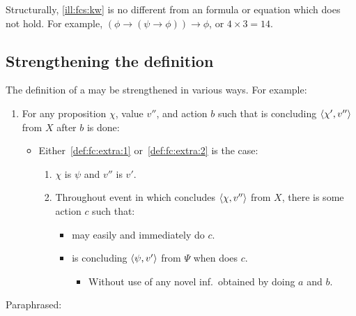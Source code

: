 \begin{note}
  Structurally, \autoref{ill:fcs:kw} is no different from an formula or equation which does not hold.
  For example, \((\phi \rightarrow (\psi \rightarrow \phi)) \rightarrow \phi\), or \(4 \times 3 = 14\).
\end{note}

\subsection{Strengthening the definition}

\begin{note}
  The definition of a \fc{} may be strengthened in various ways.
  For example:

  \begin{enumerate}[label=\alph*., ref=(\alph*), resume*=fcCounter]
  \item
    \label{def:fc:alt:c}
    For any proposition \(\chi\), value \(v''\), and action \(b\) such that \vAgent{} is concluding \(\langle \chi', v'' \rangle\) from \(X\) after \(b\) is done:
    \begin{itemize}
    \item
      Either~\ref{def:fc:extra:1} or~\ref{def:fc:extra:2} is the case:
      \begin{enumerate}[label=\arabic*., ref=\arabic*]
      \item
        \label{def:fc:extra:1}
        \(\chi\) is \(\psi\) and \(v''\) is \(v'\).
      \item
        \label{def:fc:extra:2}
        Throughout event in which \vAgent{} concludes \(\langle \chi, v'' \rangle\) from \(X\), there is some action \(c\) such that:
        \begin{itemize}
        \item
          \vAgent{} may easily and immediately do \(c\).
        \item
          \vAgent{} is concluding \(\langle \psi, v' \rangle\) from \(\Psi\) when \vAgent{} does \(c\).
          \begin{itemize}
          \item
            Without use of any novel inf.\ obtained by doing \(a\) and \(b\).
          \end{itemize}
        \end{itemize}
      \end{enumerate}
    \end{itemize}
  \end{enumerate}

  \noindent Paraphrased:


\end{note}
